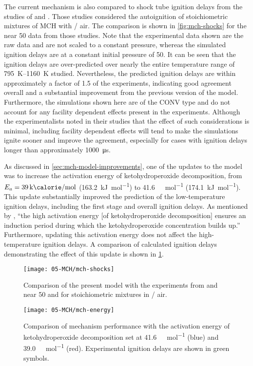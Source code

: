 \documentclass[../main.tex]{subfiles}
\begin{document}
The current mechanism is also compared to shock tube ignition delays from the
studies of \textcite{Vasu2009} and \textcite{Vanderover2009}. Those studies
considered the autoignition of stoichiometric mixtures of MCH with /
air. The comparison is shown in \cref{fig:mch-shocks} for the near \SI{50}{\atmosphere}
data from those studies. Note that the experimental data shown are the raw
data and are not scaled to a constant pressure, whereas the simulated
ignition delays are at a constant initial pressure of \SI{50}{\atmosphere}. It can be seen
that the ignition delays are over-predicted over nearly the entire temperature
range of \SIrange{795}{1160}{\kelvin} studied. Nevertheless, the predicted ignition delays are
within approximately a factor of \num{1.5} of the experiments, indicating good
agreement overall and a substantial improvement from the previous version of
the model. Furthermore, the simulations shown here are of the CONV type and
do not account for any facility dependent effects present in the experiments.
Although the experimentalists noted in their studies \cite{Vasu2009,Vanderover2009}
that the effect of such considerations is minimal, including facility
dependent effects will tend to make the simulations ignite sooner and improve
the agreement, especially for cases with ignition delays longer than
approximately \SI{1000}{\micro\second}.

As discussed in \cref{sec:mch-model-improvements}, one of the updates to the model
was to increase the activation energy of ketohydroperoxide decomposition, from
$E_a=\SI{39}{\kilo\calorie\per\mole}$ (\SI{163.2}{\kilo\joule\per\mole}) to
\SI{41.6}{\kilo\calorie\per\mole} (\SI{174.1}{\kilo\joule\per\mole}). This
update substantially improved the prediction of the low-temperature ignition
delays, including the first stage and overall ignition delays. As mentioned by
\textcite{Curran2002}, ``the high activation energy [of ketohydroperoxide
decomposition] ensures an induction period during which the ketohydroperoxide
concentration builds up.'' Furthermore, updating this activation energy does not
affect the high-temperature ignition delays. A comparison of calculated
ignition delays demonstrating the effect of this update is shown in
\cref{fig:mch-energy}.

\begin{figure}
    \begin{floatrow}
        \ffigbox
            {\texttt{[image: 05-MCH/mch-shocks]}}
            {\caption{Comparison of the present model with the experiments from
                \textcite{Vasu2009} and \textcite{Vanderover2009} near \SI{50}{\atmosphere}
                and for stoichiometric mixtures in / air.}
            \label{fig:mch-shocks}}
        \ffigbox
            {\texttt{[image: 05-MCH/mch-energy]}}
            {\caption{Comparison of mechanism performance with the activation energy
                of ketohydroperoxide decomposition set at \SI{41.6}{\kilo\calorie\per\mole} (blue) and
                \SI{39.0}{\kilo\calorie\per\mole} (red). Experimental ignition delays are shown in
                green symbols.}
            \label{fig:mch-energy}}
    \end{floatrow}
\end{figure}
\end{document}
